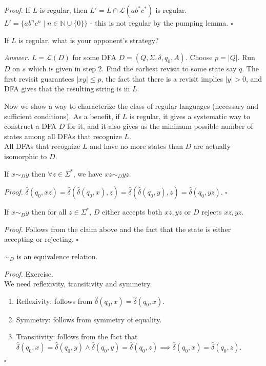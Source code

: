 \documentclass[a4paper]{article}
\newenvironment{proof}{\begin{breakbox}\textit{Proof.}}{\hfill$\square$\end{breakbox}}
\newenvironment{ans}{\begin{breakbox}\textit{Answer.}}{\end{breakbox}}
\newcommand{\nl}{\vspace{0.2cm}\\}
\newcommand{\mc}{\mathcal}
\renewcommand{\L}{\mc{L}}
\newcommand{\hd}{\hat{\delta}}
\begin{document}
\begin{proof}
    If $L$ is regular, then $L' = L \cap \L(ab^*c^*)$ is regular. $L' = \{ab^nc^n \mid n \in \mathbb{N} \cup \{0\}\}$ - this is not regular by the pumping lemma.
\end{proof}

\begin{ques}
    If $L$ is regular, what is your opponent's strategy?
\end{ques}

\begin{ans}
    $L = \L(D)$ for some DFA $D = (Q, \Sigma, \delta, q_0, A)$. Choose $p = |Q|$. Run $D$ on $s$ which is given in step 2. Find the earliest revisit to some state say $q$. The first revisit
    guarantees $|xy| \le p$, the fact that there is a revisit implies $|y| > 0$, and DFA gives that the resulting string is in $L$.
\end{ans}

Now we show a way to characterize the class of regular languages (necessary and sufficient conditions). As a benefit, if $L$ is regular, it gives a systematic way to construct a DFA $D$ for it,
and it also gives us the minimum possible number of states among all DFAs that recognize $L$.\nl
All DFAs that recognize $L$ and have no more states than $D$ are actually isomorphic to $D$.

\begin{claim}
    If $x \sim_D y$ then $\forall z \in \Sigma^*$, we have $xz \sim_D yz$.
\end{claim}

\begin{proof}
    $\hd(q_0, xz) = \hd(\hd(q_0, x), z) = \hd(\hd(q_0, y), z) = \hd(q_0, yz)$.
\end{proof}

\begin{claim}
    If $x \sim_D y$ then for all $z \in \Sigma^*$, $D$ either accepts both $xz, yz$ or $D$ rejects $xz, yz$.
\end{claim}

\begin{proof}
    Follows from the claim above and the fact that the state is either accepting or rejecting.
\end{proof}

\begin{claim}
    $\sim_D$ is an equivalence relation.
\end{claim}

\begin{proof}
    Exercise.\nl
    We need reflexivity, transitivity and symmetry.
    \begin{enumerate}
        \item Reflexivity: follows from $\hd(q_0, x) = \hd(q_0, x)$.
        \item Symmetry: follows from symmetry of equality.
        \item Transitivity: follows from the fact that $\hd(q_0, x) = \hd(q_0, y) \land \hd(q_0, y) = \hd(q_0, z) \implies \hd(q_0, x) = \hd(q_0, z)$.
    \end{enumerate}
\end{proof}
\end{document}
